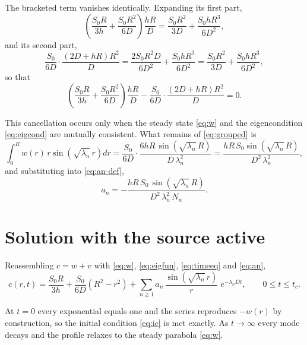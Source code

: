 \documentclass[11pt,a4paper]{article}
\begin{document}
The bracketed term vanishes identically. Expanding its first part,
\begin{equation}
\left(\frac{S_{0}R}{3h} + \frac{S_{0}R^{2}}{6D}\right)\frac{hR}{D}
= \frac{S_{0}R^{2}}{3D} + \frac{S_{0}hR^{3}}{6D^{2}} ,
\end{equation}
and its second part,
\begin{equation}
\frac{S_{0}}{6D}\cdot\frac{\left(2D + hR\right)R^{2}}{D}
= \frac{2S_{0}R^{2}D}{6D^{2}} + \frac{S_{0}hR^{3}}{6D^{2}}
= \frac{S_{0}R^{2}}{3D} + \frac{S_{0}hR^{3}}{6D^{2}} ,
\end{equation}
so that
\begin{equation}
\left(\frac{S_{0}R}{3h} + \frac{S_{0}R^{2}}{6D}\right)\frac{hR}{D}
- \frac{S_{0}}{6D}\cdot\frac{\left(2D + hR\right)R^{2}}{D} = 0 .
\end{equation}

This cancellation occurs only when the steady state \eqref{eq:w} and the
eigencondition \eqref{eq:eigcond} are mutually consistent. What remains of
\eqref{eq:grouped} is
\begin{equation}
\int_{0}^{R} w(r)\, r\sin\!\left(\sqrt{\lambda_{n}}\,r\right) dr
= \frac{S_{0}}{6D}\cdot
\frac{6hR\,\sin\!\left(\sqrt{\lambda_{n}}\,R\right)}{D\,\lambda_{n}^{2}}
= \frac{hR\,S_{0}\sin\!\left(\sqrt{\lambda_{n}}\,R\right)}{D^{2}\,\lambda_{n}^{2}} ,
\end{equation}
and substituting into \eqref{eq:an-def},
\begin{equation}
\boxed{\;
a_{n} = -\frac{hR\,S_{0}\,\sin\!\left(\sqrt{\lambda_{n}}\,R\right)}
{D^{2}\,\lambda_{n}^{2}\,N_{n}} .
\;}
\label{eq:an}
\end{equation}

\section{Solution with the source active}

Reassembling $c = w + v$ with \eqref{eq:w}, \eqref{eq:eigfun}, \eqref{eq:timeeq} and
\eqref{eq:an},
\begin{equation}
\boxed{\;
c(r,t) = \frac{S_{0}R}{3h} + \frac{S_{0}}{6D}\left(R^{2} - r^{2}\right)
+ \sum_{n \ge 1} a_{n}\,
\frac{\sin\!\left(\sqrt{\lambda_{n}}\,r\right)}{r}\;
e^{-\lambda_{n} D t} ,
\qquad 0 \le t \le t_{c} .
\;}
\label{eq:phase1}
\end{equation}

At $t = 0$ every exponential equals one and the series reproduces $-w(r)$ by
construction, so the initial condition \eqref{eq:ic} is met exactly. As
$t \to \infty$ every mode decays and the profile relaxes to the steady parabola
\eqref{eq:w}.
\end{document}
